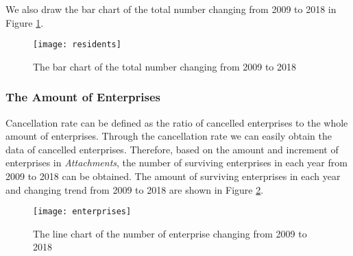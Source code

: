 \documentclass{apmcmthesis}
\begin{document}
We also draw the bar chart of the total number changing from 2009 to 2018 in Figure \ref{residents}.
\begin{figure}[h]
  \centering
  \texttt{[image: residents]}
  \caption{The bar chart of the total number changing from 2009 to 2018}\label{residents}
\end{figure}

\subsubsection{The Amount of Enterprises}
\hspace{2em}Cancellation rate can be defined as the ratio of cancelled enterprises to the whole amount of enterprises. Through the cancellation rate we can easily obtain the data of cancelled enterprises. Therefore, based on the amount and increment of enterprises in \textit{Attachments}, the number of surviving enterprises in each year from 2009 to 2018 can be obtained. The amount of surviving enterprises in each year and changing trend from 2009 to 2018 are shown in Figure \ref{enterprises}.
\begin{figure}[h]
  \centering
  \texttt{[image: enterprises]}
  \caption{The line chart of the number of enterprise  changing from 2009 to 2018}\label{enterprises}
\end{figure}
\end{document}
